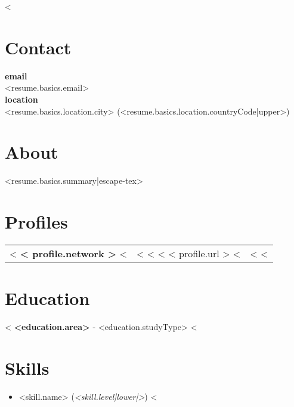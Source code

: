 \documentclass{resume}
\begin{document}
<%
\section{Contact}
\begin{multicols}{2}
\noindent\textbf{email}\\
<{resume.basics.email}>\\
\textbf{location}\\
<{resume.basics.location.city}> (<{resume.basics.location.countryCode|upper}>)
\end{multicols}
\section{About}
<{resume.basics.summary|escape-tex}>
\section{Profiles}
\begin{center}
  \begin{tabular}{ c c }
    <%
    \textbf{<{ profile.network }>}
    <%
    &
    <%
    <%
    <%
    <{ profile.url }>
    <%
    &
    <%
    <%
  \end{tabular}
\end{center}
\section{Education}
<%
\noindent\textbf{<{education.area}>} - <{education.studyType}>
<%
\section{Skills}
\begin{multicols}{2}
  \begin{itemize}
    \setlength\itemsep{0.1em}
  <%
  \item <{skill.name}> (\textit{<{skill.level|lower|}>})
  <%
  \end{itemize}
  \vspace{0.5em}
\end{multicols}
\end{document}
